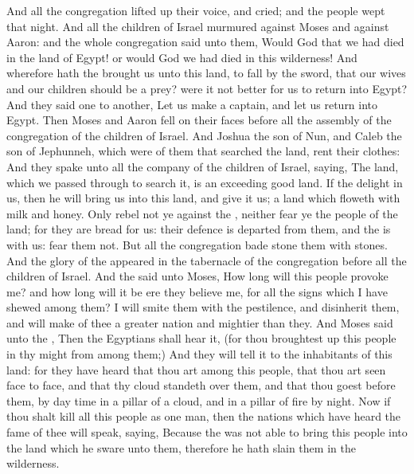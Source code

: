 \begin{biblechapter} %
 And all the congregation lifted up their voice, and cried; and the people wept that night.
\verse And all the children of Israel murmured against Moses and against Aaron: and the whole congregation said unto them, Would God that we had died in the land of Egypt! or would God we had died in this wilderness!
\verse And wherefore hath the \LORD brought us unto this land, to fall by the sword, that our wives and our children should be a prey? were it not better for us to return into Egypt?
\verse And they said one to another, Let us make a captain, and let us return into Egypt.
\verse Then Moses and Aaron fell on their faces before all the assembly of the congregation of the children of Israel.
\verse And Joshua the son of Nun, and Caleb the son of Jephunneh, which were of them that searched the land, rent their clothes:
\verse And they spake unto all the company of the children of Israel, saying, The land, which we passed through to search it, is an exceeding good land.
\verse If the \LORD delight in us, then he will bring us into this land, and give it us; a land which floweth with milk and honey.
\verse Only rebel not ye against the \LORD, neither fear ye the people of the land; for they are bread for us: their defence is departed from them, and the \LORD is with us: fear them not.
\verse But all the congregation bade stone them with stones. And the glory of the \LORD appeared in the tabernacle of the congregation before all the children of Israel.
\verse And the \LORD said unto Moses, How long will this people provoke me? and how long will it be ere they believe me, for all the signs which I have shewed among them?
\verse I will smite them with the pestilence, and disinherit them, and will make of thee a greater nation and mightier than they.
\verse And Moses said unto the \LORD, Then the Egyptians shall hear it, (for thou broughtest up this people in thy might from among them;)
\verse And they will tell it to the inhabitants of this land: for they have heard that thou \LORD art among this people, that thou \LORD art seen face to face, and that thy cloud standeth over them, and that thou goest before them, by day time in a pillar of a cloud, and in a pillar of fire by night.
\verse Now if thou shalt kill all this people as one man, then the nations which have heard the fame of thee will speak, saying,
\verse Because the \LORD was not able to bring this people into the land which he sware unto them, therefore he hath slain them in the wilderness.

\end{biblechapter}
